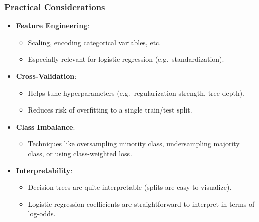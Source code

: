 \documentclass[aspectratio=169]{beamer}
\begin{document}
\begin{frame}
    \frametitle{Practical Considerations}
    \begin{itemize}
        \item \textbf{Feature Engineering}:
        \begin{itemize}
            \item Scaling, encoding categorical variables, etc.
            \item Especially relevant for logistic regression (e.g.\ standardization).
        \end{itemize}
        \item \textbf{Cross-Validation}:
        \begin{itemize}
            \item Helps tune hyperparameters (e.g.\ regularization strength, tree depth).
            \item Reduces risk of overfitting to a single train/test split.
        \end{itemize}
        \item \textbf{Class Imbalance}:
        \begin{itemize}
            \item Techniques like oversampling minority class, undersampling majority class, or using class-weighted loss.
        \end{itemize}
        \item \textbf{Interpretability}:
        \begin{itemize}
            \item Decision trees are quite interpretable (splits are easy to visualize).
            \item Logistic regression coefficients are straightforward to interpret in terms of log-odds.
        \end{itemize}
    \end{itemize}
\end{frame}
\end{document}

